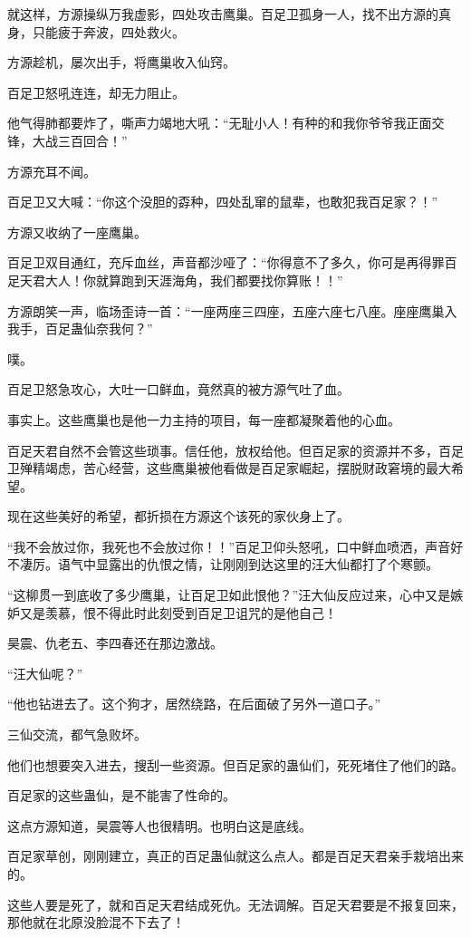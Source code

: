 \begin{this_body}
就这样，方源操纵万我虚影，四处攻击鹰巢。百足卫孤身一人，找不出方源的真身，只能疲于奔波，四处救火。

方源趁机，屡次出手，将鹰巢收入仙窍。

百足卫怒吼连连，却无力阻止。

他气得肺都要炸了，嘶声力竭地大吼：“无耻小人！有种的和我你爷爷我正面交锋，大战三百回合！”

方源充耳不闻。

百足卫又大喊：“你这个没胆的孬种，四处乱窜的鼠辈，也敢犯我百足家？！”

方源又收纳了一座鹰巢。

百足卫双目通红，充斥血丝，声音都沙哑了：“你得意不了多久，你可是再得罪百足天君大人！你就算跑到天涯海角，我们都要找你算账！！”

方源朗笑一声，临场歪诗一首：“一座两座三四座，五座六座七八座。座座鹰巢入我手，百足蛊仙奈我何？”

噗。

百足卫怒急攻心，大吐一口鲜血，竟然真的被方源气吐了血。

事实上。这些鹰巢也是他一力主持的项目，每一座都凝聚着他的心血。

百足天君自然不会管这些琐事。信任他，放权给他。但百足家的资源并不多，百足卫殚精竭虑，苦心经营，这些鹰巢被他看做是百足家崛起，摆脱财政窘境的最大希望。

现在这些美好的希望，都折损在方源这个该死的家伙身上了。

“我不会放过你，我死也不会放过你！！”百足卫仰头怒吼，口中鲜血喷洒，声音好不凄厉。语气中显露出的仇恨之情，让刚刚到达这里的汪大仙都打了个寒颤。

“这柳贯一到底收了多少鹰巢，让百足卫如此恨他？”汪大仙反应过来，心中又是嫉妒又是羡慕，恨不得此时此刻受到百足卫诅咒的是他自己！

昊震、仇老五、李四春还在那边激战。

“汪大仙呢？”

“他也钻进去了。这个狗才，居然绕路，在后面破了另外一道口子。”

三仙交流，都气急败坏。

他们也想要突入进去，搜刮一些资源。但百足家的蛊仙们，死死堵住了他们的路。

百足家的这些蛊仙，是不能害了性命的。

这点方源知道，昊震等人也很精明。也明白这是底线。

百足家草创，刚刚建立，真正的百足蛊仙就这么点人。都是百足天君亲手栽培出来的。

这些人要是死了，就和百足天君结成死仇。无法调解。百足天君要是不报复回来，那他就在北原没脸混不下去了！


\end{this_body}
